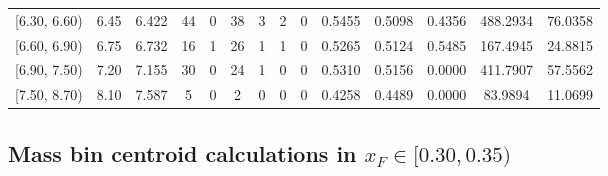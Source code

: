 \begin{table}[htbp]
{\begin{tabular}{cc|c|cccccc|ccc|cc}
        {[6.30, 6.60)} & 6.45 & 6.422 & 44 & 0 & 38 & 3 & 2 & 0 & 0.5455 & 0.5098 & 0.4356 & 488.2934 & 76.0358 \\
        {[6.60, 6.90)} & 6.75 & 6.732 & 16 & 1 & 26 & 1 & 1 & 0 & 0.5265 & 0.5124 & 0.5485 & 167.4945 & 24.8815 \\
        {[6.90, 7.50)} & 7.20 & 7.155 & 30 & 0 & 24 & 1 & 0 & 0 & 0.5310 & 0.5156 & 0.0000 & 411.7907 & 57.5562 \\
        {[7.50, 8.70)} & 8.10 & 7.587 & 5 & 0 & 2 & 0 & 0 & 0 & 0.4258 & 0.4489 & 0.0000 & 83.9894 & 11.0699 \\
        \hline\hline
    \end{tabular}
    }
\end{table}

\clearpage
\subsection{\texorpdfstring{Mass bin centroid calculations in $x_F \in [0.30, 0.35)$}{Mass bin centroid calculations in x\_F in [0.30, 0.35)]}}

